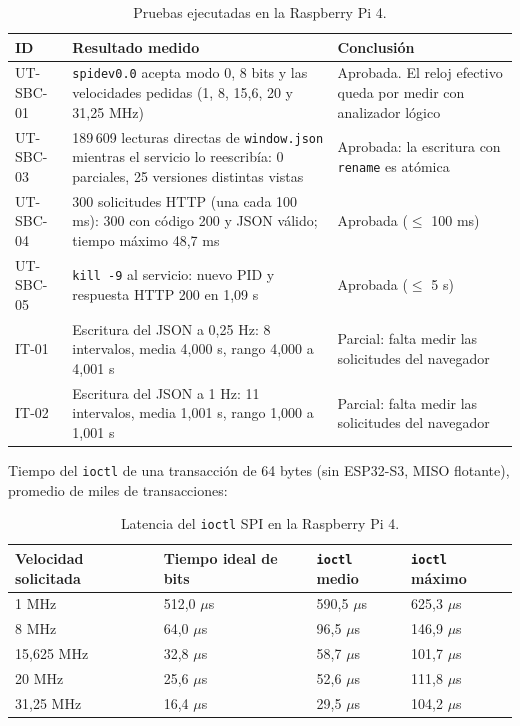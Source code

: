 \documentclass[12pt,a4paper]{article}
\begin{document}
\begin{table}[H]
\centering
\small
\begin{tabular}{@{}p{1.8cm} p{6.4cm} p{6.8cm}@{}}
\toprule
\textbf{ID} & \textbf{Resultado medido} & \textbf{Conclusión} \\
\midrule
UT-SBC-01 & \texttt{spidev0.0} acepta modo 0, 8 bits y las velocidades pedidas (1, 8, 15{,}6, 20 y 31{,}25 MHz) & Aprobada. El reloj efectivo queda por medir con analizador lógico \\
UT-SBC-03 & 189\,609 lecturas directas de \texttt{window.json} mientras el servicio lo reescribía: 0 parciales, 25 versiones distintas vistas & Aprobada: la escritura con \texttt{rename} es atómica \\
UT-SBC-04 & 300 solicitudes HTTP (una cada 100 ms): 300 con código 200 y JSON válido; tiempo máximo 48{,}7 ms & Aprobada ($\leq$ 100 ms) \\
UT-SBC-05 & \texttt{kill -9} al servicio: nuevo PID y respuesta HTTP 200 en 1{,}09 s & Aprobada ($\leq$ 5 s) \\
IT-01 & Escritura del JSON a 0{,}25 Hz: 8 intervalos, media 4{,}000 s, rango 4{,}000 a 4{,}001 s & Parcial: falta medir las solicitudes del navegador \\
IT-02 & Escritura del JSON a 1 Hz: 11 intervalos, media 1{,}001 s, rango 1{,}000 a 1{,}001 s & Parcial: falta medir las solicitudes del navegador \\
\bottomrule
\end{tabular}
\caption{Pruebas ejecutadas en la Raspberry Pi 4.}
\end{table}

Tiempo del \texttt{ioctl} de una transacción de 64 bytes (sin ESP32-S3, MISO flotante), promedio de miles de transacciones:

\begin{table}[H]
\centering
\small
\begin{tabular}{@{}p{3.4cm} p{3.4cm} p{3.4cm} p{3.4cm}@{}}
\toprule
\textbf{Velocidad solicitada} & \textbf{Tiempo ideal de bits} & \textbf{\texttt{ioctl} medio} & \textbf{\texttt{ioctl} máximo} \\
\midrule
1 MHz      & 512{,}0 $\mu$s & 590{,}5 $\mu$s & 625{,}3 $\mu$s \\
8 MHz      & 64{,}0 $\mu$s  & 96{,}5 $\mu$s  & 146{,}9 $\mu$s \\
15{,}625 MHz & 32{,}8 $\mu$s & 58{,}7 $\mu$s & 101{,}7 $\mu$s \\
20 MHz     & 25{,}6 $\mu$s  & 52{,}6 $\mu$s  & 111{,}8 $\mu$s \\
31{,}25 MHz & 16{,}4 $\mu$s & 29{,}5 $\mu$s  & 104{,}2 $\mu$s \\
\bottomrule
\end{tabular}
\caption{Latencia del \texttt{ioctl} SPI en la Raspberry Pi 4.}
\end{table}
\end{document}
